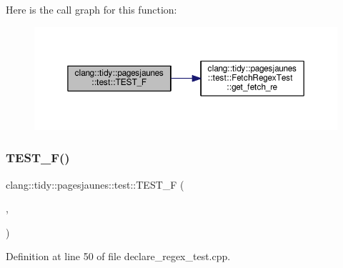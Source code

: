 Here is the call graph for this function\+:
\nopagebreak
\begin{figure}[H]
\begin{center}
\leavevmode
\includegraphics[width=350pt]{namespaceclang_1_1tidy_1_1pagesjaunes_1_1test_af73c5ad3ee3e0701c44689229929623e_cgraph}
\end{center}
\end{figure}
\mbox{\label{namespaceclang_1_1tidy_1_1pagesjaunes_1_1test_a080275839e8bb38170228d7b0d8db4b5}} 
\subsubsection{\texorpdfstring{T\+E\+S\+T\+\_\+\+F()}{TEST\_F()}\hspace{0.1cm}{\footnotesize\ttfamily [7/57]}}
{\footnotesize\ttfamily clang\+::tidy\+::pagesjaunes\+::test\+::\+T\+E\+S\+T\+\_\+F (\begin{DoxyParamCaption}\item[{\hyperlink{classclang_1_1tidy_1_1pagesjaunes_1_1test_1_1_declare_regex_test}{Declare\+Regex\+Test}}]{,  }\item[{Regex\+Matching}]{ }\end{DoxyParamCaption})}



Definition at line 50 of file declare\+\_\+regex\+\_\+test.\+cpp.

